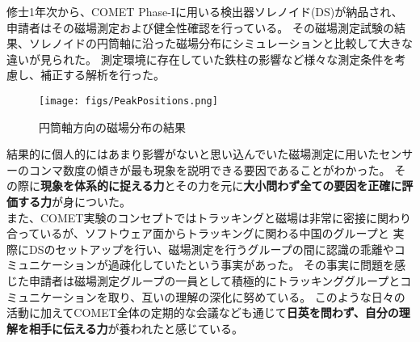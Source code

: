 \documentclass[11pt,a4j,dvipdfmx]{jarticle} 					%
\newcommand{\研究課題名}{COMET Phase-Iに向けたエンジニアリングランおよびその物理解析}
\newcommand{\研究機関名}{大阪大学}
\newcommand{\研究代表者氏名}{高見 翔太   }
\begin{document}
修士1年次から、COMET Phase-Iに用いる検出器ソレノイド(DS)が納品され、申請者はその磁場測定および健全性確認を行っている。
その磁場測定試験の結果、ソレノイドの円筒軸に沿った磁場分布にシミュレーションと比較して大きな違いが見られた。
測定環境に存在していた鉄柱の影響など様々な測定条件を考慮し、補正する解析を行った。
\begin{wrapfigure}[12]{r}{190pt}{}
	\centering
	 \vspace{-0.4cm}
	 \hspace*{-15pt}
	 \texttt{[image: figs/PeakPositions.png]}
	 \vspace{-1.0cm}
	 \caption{\small{円筒軸方向の磁場分布の結果\\
	 }}
	 \label{Fig:peakpositions}
	\end{wrapfigure} 
結果的に個人的にはあまり影響がないと思い込んでいた磁場測定に用いたセンサーのコンマ数度の傾きが最も現象を説明できる要因であることがわかった。
その際に\textbf{現象を体系的に捉える力}とその力を元に\textbf{大小問わず全ての要因を正確に評価する力}が身についた。\\
また、COMET実験のコンセプトではトラッキングと磁場は非常に密接に関わり合っているが、ソフトウェア面からトラッキングに関わる中国のグループと
実際にDSのセットアップを行い、磁場測定を行うグループの間に認識の乖離やコミュニケーションが過疎化していたという事実があった。
その事実に問題を感じた申請者は磁場測定グループの一員として積極的にトラッキンググループとコミュニケーションを取り、互いの理解の深化に努めている。
このような日々の活動に加えてCOMET全体の定期的な会議なども通じて\textbf{日英を問わず、自分の理解を相手に伝える力}が養われたと感じている。

\end{document}

